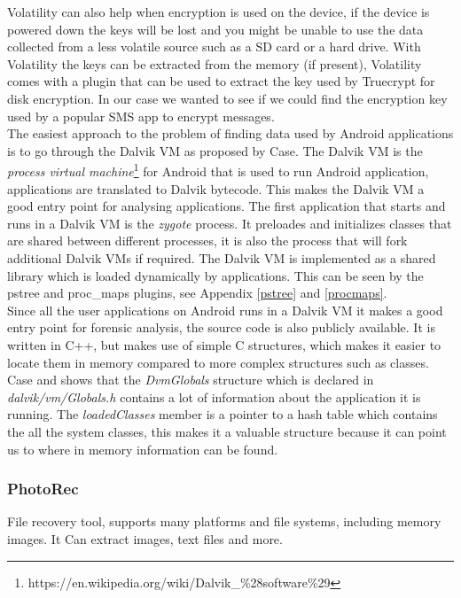 Volatility can also help when encryption is used on the device, if the device is
powered down the keys will be lost and you might be unable to use the data 
collected from a less volatile source such as a SD card or a hard drive. With
Volatility the keys can be extracted from the memory (if present), Volatility 
comes with a plugin that can be used to extract the key used by Truecrypt for 
disk encryption. In our case we wanted to see if we could find the encryption
key used by a popular SMS app to encrypt messages.\\

The easiest approach to the problem of finding data used by Android
applications is to go through the Dalvik VM as proposed by Case\cite{case2011}.
The Dalvik VM is the \textit{process virtual
machine}\footnote{https://en.wikipedia.org/wiki/Dalvik\_\%28software\%29} for
Android that is used to run Android application, applications are translated to
Dalvik bytecode. This makes the Dalvik VM a good entry point for analysing
applications. The first application that starts and runs in a Dalvik VM is the
\textit{zygote} process. It preloades and initializes classes that are shared
between different processes, it is also the process that will fork additional
Dalvik VMs if required. The Dalvik VM is implemented as a shared library which
is loaded dynamically by applications. This can be seen by the pstree and
proc\_maps plugins, see Appendix \ref{pstree} and \ref{procmaps}. \\

Since all the user applications on Android runs in a Dalvik VM it makes a good entry
point for forensic analysis, the source code is also publicly available. It is
written in C++, but makes use of simple C structures, which makes it easier to
locate them in memory compared to more complex structures such as classes. Case
and \cite{holger} shows that the \textit{DvmGlobals} structure which is
declared in \textit{dalvik/vm/Globals.h} contains a lot of information about
the application it is running. The \textit{loadedClasses} member is a pointer
to a hash table which contains the all the system classes, this makes it a
valuable structure because it can point us to where in memory information can
be found. 



  \subsubsection{PhotoRec}
  File recovery tool, supports many platforms and file systems, including memory images. 
  It Can extract images, text files and more.

